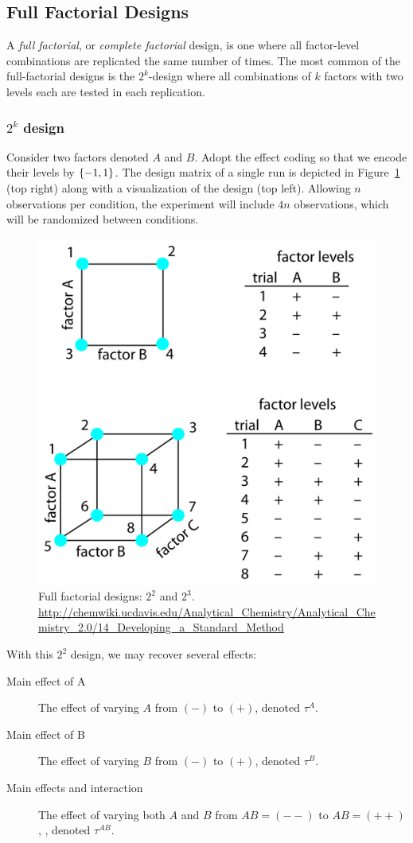 \subsection{Full Factorial Designs}
A \emph{full factorial}, or \emph{complete factorial} design, is one where all factor-level combinations are replicated the same number of times.
The most common of the full-factorial designs is the $2^k$-design where all combinations of $k$ factors with two levels each are tested in each replication.



\subsubsection{$2^k$ design}
Consider two factors denoted $A$ and $B$.
Adopt the effect coding so that we encode their levels by $\{ -1,1 \}$.
The design matrix of a single run is depicted in Figure~\ref{fig:full_factorial} (top right) along with a visualization of the design (top left).
Allowing $n$ observations per condition, the experiment will include $4n$ observations, which will be randomized between conditions.

\begin{figure}[ht]
\centering
\includegraphics[width=0.7\linewidth, height=0.3\textheight]{art/full_factorial}
\caption[Full Factorial Design]{Full factorial designs: $2^2$ and $2^3$. \newline \url{http://chemwiki.ucdavis.edu/Analytical_Chemistry/Analytical_Chemistry_2.0/14_Developing_a_Standard_Method}}
\label{fig:full_factorial}
\end{figure}
With this $2^2$ design, we may recover several effects:
\begin{description}
\item [Main effect of A] The effect of varying $A$ from $(-)$ to $(+)$, denoted $\tau^A$.
\item [Main effect of B] The effect of varying $B$ from $(-)$ to $(+)$, denoted $\tau^B$.
\item [Main effects and interaction] The effect of varying both $A$ and $B$ from $AB=(--)$ to $AB=(++)$, , denoted $\tau^{AB}$.
\end{description}


